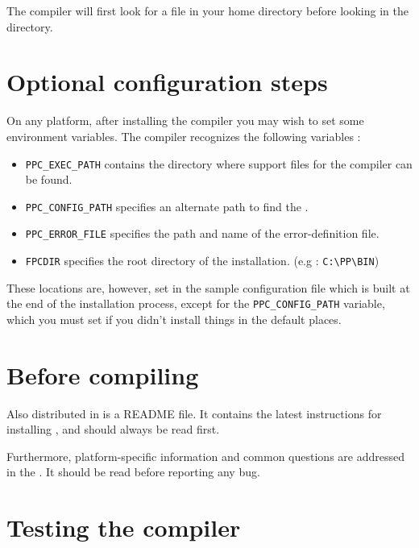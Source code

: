 The compiler will first look for a file  in your home 
directory before looking in the  directory.

\section{Optional configuration steps}
On any platform, after installing the compiler you may wish to set
some environment variables. The \fpc compiler recognizes the 
following variables :

\begin{itemize}
\item \verb|PPC_EXEC_PATH| contains the directory where support files for
the compiler can be found.
\item \verb|PPC_CONFIG_PATH| specifies an alternate path to find the .
\item \verb|PPC_ERROR_FILE|  specifies the path and name of the error-definition file.
\item \verb|FPCDIR| specifies the root directory of the \fpc installation.
(e.g : \verb|C:\PP\BIN|)
\end{itemize}

These locations are, however, set in the sample configuration file which is
built at the end of the installation process, except for the
\verb|PPC_CONFIG_PATH| variable, which you must set if you didn't install
things in the default places.

\section{Before compiling}

Also distributed in \fpc is a README file. It contains the latest
instructions for installing \fpc, and should always be read first.

Furthermore, platform-specific information and common questions
are addressed in the . It should be read before reporting any 
bug.


\section{Testing the compiler}

